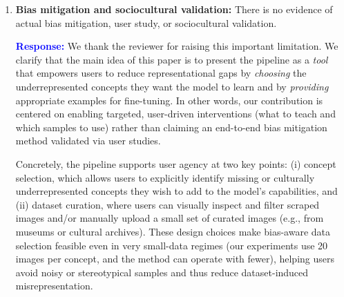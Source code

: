 \documentclass[11pt]{article}
\begin{document}
\begin{enumerate}[label=\textbf{C\arabic*.}, leftmargin=*]
\textbf{\textcolor{blue}{Response:}} We thank the reviewer for this comment. In response, we expanded the Methodology section (Section 3.1) to clarify key dataset details and the data-handling steps used in our experiments. In particular, we now make explicit the dataset size used for fine-tuning (a fixed set of 20 images per concept in our study), describe the practical cleaning/quality-control mechanisms (user-facing visual inspection and filtering of retrieved samples, with optional manual upload of curated images), and clarify that the pipeline’s data sourcing is not inherently tied to a single web platform and can be adapted to copyright-safe repositories depending on the deployment context.

Regarding evaluation, we agree that CLIP Score and FID are standard metrics and do not fully capture cultural fidelity. We therefore position them as quantitative proxies that complement our qualitative visual assessment (Figures 1 and 2). As detailed in our response above on evaluation metrics and sample size, we have since added KID and 95\% bootstrap confidence intervals (Table 2, Section 3.7.3), so the quantitative comparisons in this revision are no longer single-point estimates. What remains future work, and is acknowledged as such in the revised Conclusions, is human evaluation and validation by cultural experts or affected communities, which automatic metrics and confidence intervals cannot substitute for.
\item \textbf{Bias mitigation and sociocultural validation:} There is no evidence of actual bias mitigation, user study, or sociocultural validation.

\textbf{\textcolor{blue}{Response:}} We thank the reviewer for raising this important limitation. We clarify that the main idea of this paper is to present the pipeline as a \emph{tool} that empowers users to reduce representational gaps by \emph{choosing} the underrepresented concepts they want the model to learn and by \emph{providing} appropriate examples for fine-tuning. In other words, our contribution is centered on enabling targeted, user-driven interventions (what to teach and which samples to use) rather than claiming an end-to-end bias mitigation method validated via user studies.

Concretely, the pipeline supports user agency at two key points: (i) concept selection, which allows users to explicitly identify missing or culturally underrepresented concepts they wish to add to the model’s capabilities, and (ii) dataset curation, where users can visually inspect and filter scraped images and/or manually upload a small set of curated images (e.g., from museums or cultural archives). These design choices make bias-aware data selection feasible even in very small-data regimes (our experiments use 20 images per concept, and the method can operate with fewer), helping users avoid noisy or stereotypical samples and thus reduce dataset-induced misrepresentation.


\end{enumerate}
\end{document}
